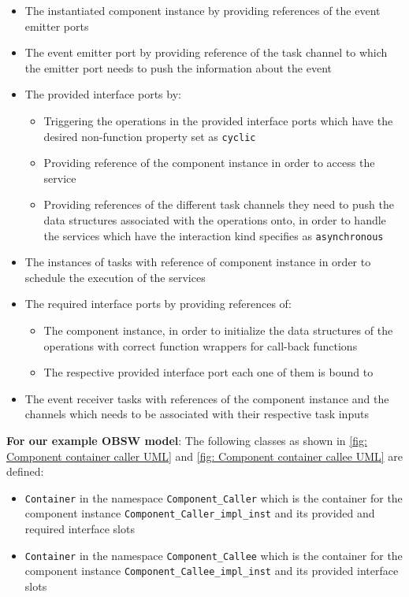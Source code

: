 \begin{itemize}
\item The instantiated component instance by providing references of the event emitter ports
\item The event emitter port by providing reference of the task channel to which the emitter port needs to push the information about the event
\item The provided interface ports by:
\begin{itemize}
\item Triggering the operations in the provided interface ports which have the desired non-function property set as \texttt{cyclic} 	
\item Providing reference of the component instance in order to access the service
\item Providing references of the different task channels they need to push the data structures associated with the operations onto, in order to handle the services which have the interaction kind specifies as \texttt{asynchronous} 
\end{itemize}
\item The instances of tasks with reference of component instance in order to schedule the execution of the services
\item The required interface ports by providing references of:
\begin{itemize}
\item The component instance, in order to initialize the data structures of the operations with correct function wrappers for call-back functions
\item The respective provided interface port each one of them is bound to 
\end{itemize}
\item The event receiver tasks with references of the component instance and the channels which needs to be associated with their respective task inputs      
\end{itemize}

\textbf{For our example OBSW model}: The following classes as shown in \cref{fig: Component container caller UML} and \cref{fig: Component container callee UML} are defined:

\begin{itemize}
\item \texttt{Container} in the namespace \texttt{Component\allowbreak\_Caller} which is the container for the component instance \texttt{Component\allowbreak\_Caller\allowbreak\_impl\allowbreak\_inst} and its provided and required interface slots
\item \texttt{Container} in the namespace \texttt{Component\allowbreak\_Callee} which is the container for the component instance \texttt{Component\allowbreak\_Callee\allowbreak\_impl\allowbreak\_inst} and its provided interface slots 
\end{itemize}

